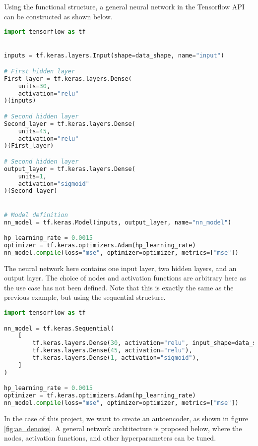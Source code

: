 Using the functional structure, a general neural network in the Tensorflow API can be constructed as shown below. 
\begin{lstlisting}[language=Python, style=pythonstyle, label={code:python_func_example_general}]
import tensorflow as tf


inputs = tf.keras.layers.Input(shape=data_shape, name="input")

# First hidden layer
First_layer = tf.keras.layers.Dense(
    units=30,
    activation="relu"
)(inputs)

# Second hidden layer
Second_layer = tf.keras.layers.Dense(
    units=45, 
    activation="relu"
)(First_layer)

# Second hidden layer
output_layer = tf.keras.layers.Dense(
    units=1, 
    activation="sigmoid"
)(Second_layer)


# Model definition
nn_model = tf.keras.Model(inputs, output_layer, name="nn_model")

hp_learning_rate = 0.0015
optimizer = tf.keras.optimizers.Adam(hp_learning_rate)
nn_model.compile(loss="mse", optimizer=optimizer, metrics=["mse"]) 
\end{lstlisting}
The neural network here contains one input layer, two hidden layers, and an output layer. The choice of nodes and activation functions are 
arbitrary here as the use case has not been defined. Note that this is exactly the same as the previous example, but using the sequential structure.


\begin{lstlisting}[language=Python, style=pythonstyle, label={code:python_seq_example}]
import tensorflow as tf

nn_model = tf.keras.Sequential(
    [
        tf.keras.layers.Dense(30, activation="relu", input_shape=data_shape),
        tf.keras.layers.Dense(45, activation="relu"),
        tf.keras.layers.Dense(1, activation="sigmoid"),
    ]
)

hp_learning_rate = 0.0015
optimizer = tf.keras.optimizers.Adam(hp_learning_rate)
nn_model.compile(loss="mse", optimizer=optimizer, metrics=["mse"]) 
\end{lstlisting}

In the case of this project, we want to create an autoencoder, as shown in figure \ref{fig:ae_denoise}. A general network archtitecture is proposed below, 
where the nodes, activation functions, and other hyperparameters can be tuned. 



